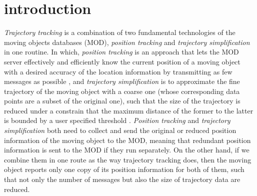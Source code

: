 

\section{introduction}
\label{sec-intro}


\textit{Trajectory tracking} \cite{Lange:Tracking} is a combination of  two fundamental technologies of the moving objects databases (MOD), \textit{position tracking} \cite{Wolfson:PositionTracking,Leonhardi:Comparison} and \textit{trajectory simplification} \cite{Lin:Cised,Zhang:Evaluation} in one routine. In which, \textit{position tracking} is an approach that lets the MOD server effectively and efficiently know the current position of a moving object with a desired accuracy of the location information by transmitting as few messages as possible \cite{Leonhardi:Comparison}, and \textit{trajectory simplification} is to approximate the fine trajectory of the moving object with a coarse one (whose corresponding data points are a subset of the original one), such that the size of the trajectory is reduced under a constrain that the maximum distance of the former to the latter is bounded by a user specified threshold \cite{Lin:Cised,Zhang:Evaluation}. 
\textit{Position tracking} and \textit{trajectory simplification} both need to collect and send the original or reduced position information of the moving object to the MOD, meaning that redundant position information is sent to the MOD if they run separately.
%
On the other hand, if we combine them in one route as the way trajectory tracking does, then the moving object reports only one copy of its position information for both of them, such that not only the number of messages but also the size of trajectory data are reduced. 


